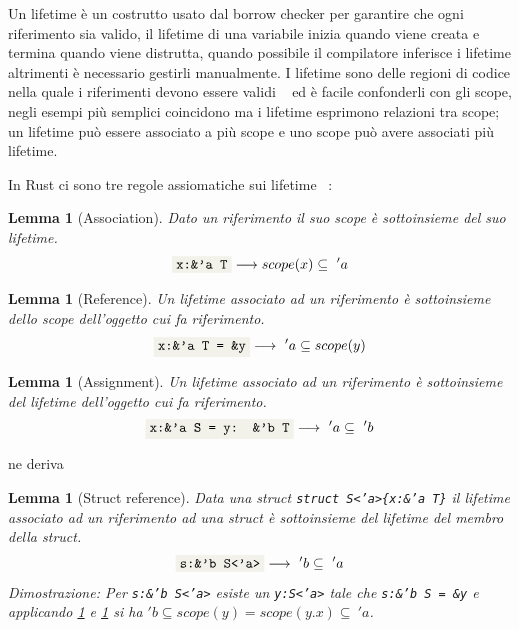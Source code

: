 \documentclass[Lau,binding=0.6cm]{sapthesis}
\newtheorem{lemma}[theorem]{Lemma}
\newcommand{\textcode}[1]{\colorbox{backcolour}{\texttt{#1}}}
\begin{document}
Un lifetime è un costrutto usato dal borrow checker per garantire che ogni riferimento sia valido, il lifetime di una variabile inizia quando viene creata e termina quando viene distrutta, quando possibile il compilatore inferisce i lifetime altrimenti è necessario gestirli manualmente. 
I lifetime sono delle regioni di codice nella quale i riferimenti devono essere validi ~\cite[3.3]{rust:rustonomicon} ed è facile confonderli con gli scope, negli esempi più semplici coincidono ma i lifetime esprimono relazioni tra scope; un lifetime può essere associato a più scope e uno scope può avere associati più lifetime. 

In Rust ci sono tre regole assiomatiche sui lifetime ~\cite{mechpen:misundestand}:

\begin{lemma}[Association] \label{lemma:association}
    Dato un riferimento il suo scope è sottoinsieme del suo lifetime.
    \begin{equation*}
        \textnormal{\textcode{x:\&'a T}} \longrightarrow  scope(x) \subseteq \ 'a
    \end{equation*}
\end{lemma}

\begin{lemma}[Reference] \label{lemma:reference}
    Un lifetime associato ad un riferimento è sottoinsieme dello scope dell'oggetto cui fa riferimento. 
    \begin{equation*}
        \textnormal{\textcode{x:\&'a T = \&y}} \longrightarrow \ 'a \subseteq scope(y)
    \end{equation*}
\end{lemma}

\begin{lemma}[Assignment] \label{lemma:assignment}
    Un lifetime associato ad un riferimento è sottoinsieme del lifetime dell'oggetto cui fa riferimento.
    \begin{equation*}
        \textnormal{\textcode{x:\&'a S = y: \&'b T}} \longrightarrow \ 'a \subseteq \ 'b
    \end{equation*}
\end{lemma}

ne deriva

\begin{lemma}[Struct reference] \label{lemma:struct_reference}
    Data una struct \textnormal{\textcode{struct S<'a>\{x:\&'a T\}}} il lifetime associato ad un riferimento ad una struct è sottoinsieme del lifetime del membro della struct.
    \begin{equation*}
        \textnormal{\textcode{s:\&'b S<'a>}} \longrightarrow \ 'b \subseteq \ 'a
    \end{equation*}
    Dimostrazione: \textnormal{Per \textnormal{\textcode{s:\&'b S<'a>}} esiste un \textcode{y:S<'a>} tale che \textcode{s:\&'b S = \&y} e applicando \ref{lemma:reference} e \ref{lemma:association} si ha} $ 'b \subseteq scope(y) = scope(y.x) \subseteq \ 'a  $.
\end{lemma}
\end{document}
